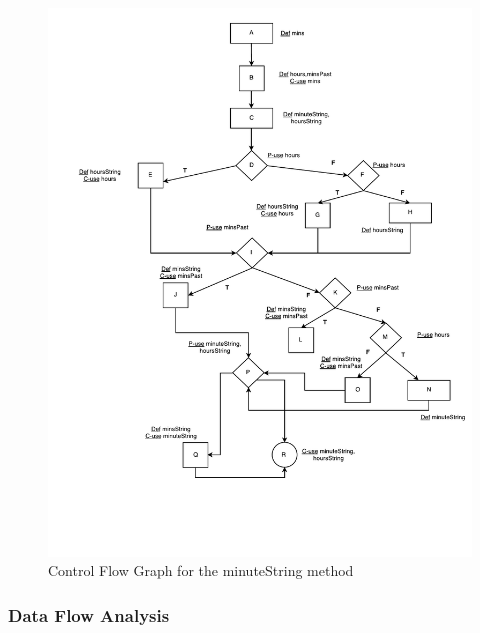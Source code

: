 \documentclass[fontsize=12pt,paper=letter,twoside]{scrartcl}
\begin{document}
\begin{figure}[!htb]
\begin{center}
\includegraphics[width=.99\textwidth]{images/dft/cfg_drawio.pdf}
\end{center}
\caption{Control Flow Graph for the minuteString method}
\label{fig:cfg}
\end{figure}

\clearpage
\newpage
\subsubsection{Data Flow Analysis}
\end{document}
